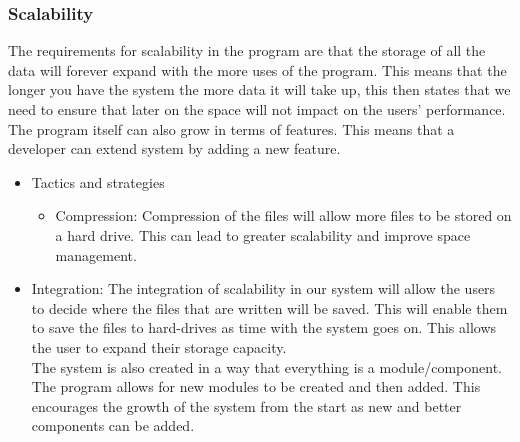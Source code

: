 
%

\subsubsection{Scalability}
\begin{flushleft}
The requirements for scalability in the program are that the storage of all the data will forever expand with the more uses of the program. This means that the longer you have the system the more data it will take up, this then states that we need to ensure that later on the space will not impact on the users' performance. The program itself can also grow in terms of features. This means that a developer can extend system by adding a new feature.
\begin{itemize}
\item{Tactics and strategies}
\begin{itemize}
\item{Compression}: Compression of the files will allow more files to be stored on a hard drive. This can lead to greater scalability and improve space management.
\end{itemize}

\item{Integration}: The integration of scalability in our system will allow the users to decide where the files that are written will be saved. This will enable them to save the files to hard-drives as time with the system goes on. This allows the user to expand their storage capacity. \\
The system is also created in a way that everything is a module/component. The program allows for new modules to be created and then added. This encourages the growth of the system from the start as new and better components can be added.
\end{itemize}

\end{flushleft}
		

